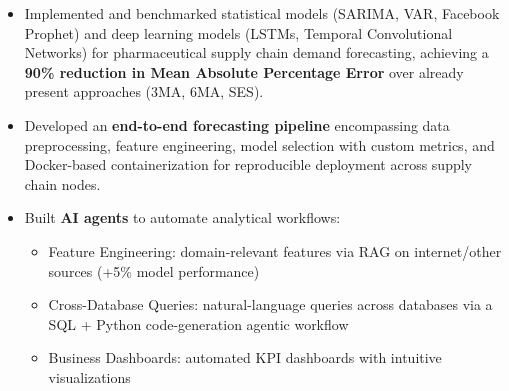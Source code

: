 \documentclass[letterpaper,11pt]{article}
\newcommand{\resumeItem}[1]{
  \item\small{
    {#1 \vspace{-2pt}}
  }
}
\newcommand{\resumeItemListStart}{\begin{itemize}}
\newcommand{\resumeItemListEnd}{\end{itemize}\vspace{-5pt}}
\begin{document}
\vspace{-5pt}
\resumeItemListStart
\resumeItem{Implemented and benchmarked statistical models (SARIMA, VAR, Facebook Prophet) and deep learning models (LSTMs, Temporal Convolutional Networks) for pharmaceutical supply chain demand forecasting, achieving a \textbf{90\% reduction in Mean Absolute Percentage Error} over already present approaches (3MA, 6MA, SES).}
\vspace{-3pt}
\resumeItem{Developed an \textbf{end-to-end forecasting pipeline} encompassing data preprocessing, feature engineering, model selection with custom metrics, and Docker-based containerization for reproducible deployment across supply chain nodes.}
    \vspace{-3pt}
    \resumeItem{Built \textbf{AI agents} to automate analytical workflows:}
    \vspace{-7pt}
    \begin{itemize}[leftmargin=0.15in]
      \item\small{Feature Engineering: domain-relevant features via RAG on internet/other sources (+5\% model performance)\vspace{-4pt}}
      \item\small{Cross-Database Queries: natural-language queries across databases via a SQL + Python code-generation agentic workflow\vspace{-4pt}}
      \item\small{Business Dashboards: automated KPI dashboards with intuitive visualizations\vspace{-2pt}}
    \end{itemize}
  \resumeItemListEnd
\vspace{-5pt}
\vspace{-5pt}
\end{document}
